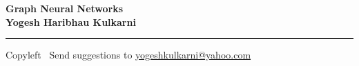 
\graphicspath{{images/}}

\footnotesize


\begin{center}
\Large{\textbf{Graph Neural Networks\\ Yogesh Haribhau Kulkarni}}  
\end{center}

\begin{multicols}{2}

\end{multicols}

\rule{\linewidth}{0.25pt}
\scriptsize
Copyleft \textcopyleft\  Send suggestions to 
\href{http://www.yogeshkulkarni.com}{yogeshkulkarni@yahoo.com}


